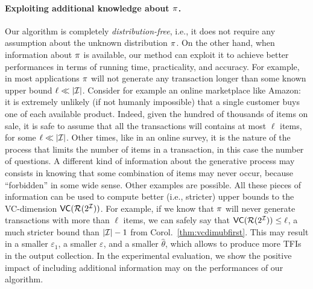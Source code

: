 \paragraph{Exploiting additional knowledge about $\pi$.}
Our algorithm is completely \emph{distribution-free}, i.e., it does not require
any assumption about the unknown distribution $\pi$. On the other hand, when
information about $\pi$ is available, our method can exploit it to achieve
better performances in terms of running time, practicality, and accuracy.
For example, in most applications $\pi$ will not generate any transaction
longer than some known upper bound $\ell\ll|{\cal I}|$. Consider for example an
online marketplace like Amazon: it is extremely unlikely (if not humanly
impossible) that a single customer buys one of each available product. Indeed,
given the hundred of thousands of items on sale, it is safe to assume that all
the transactions will contains at most $\ell$ items, for some $\ell\ll|{\cal I}|$. Other
times, like in an online survey, it is the nature of the process that limits the
number of items in a transaction, in this case the number of questions. A
different kind of information about the generative process may consists in
knowing that some combination of items may never occur, because ``forbidden'' in
some wide sense. Other examples are possible. All these pieces of information
can be used to compute better (i.e., stricter) upper bounds to the VC-dimension
$\mathsf{VC}(\mathcal{R}(2^{\cal I}))$. For example, if we know that $\pi$ will never generate
transactions with more than $\ell$ items, we can safely say that
$\mathsf{VC}(\mathcal{R}(2^{\cal I}))\le \ell$, a much stricter bound than $|{\cal I}|-1$ from
Corol.~\ref{thm:vcdimubfirst}. This may result in a smaller $\varepsilon_1$, a
smaller $\varepsilon$, and a smaller $\hat\theta$, which allows to produce more
TFIs in the output collection. In the experimental evaluation, we show the
positive impact of including additional information may on the performances of
our algorithm.
